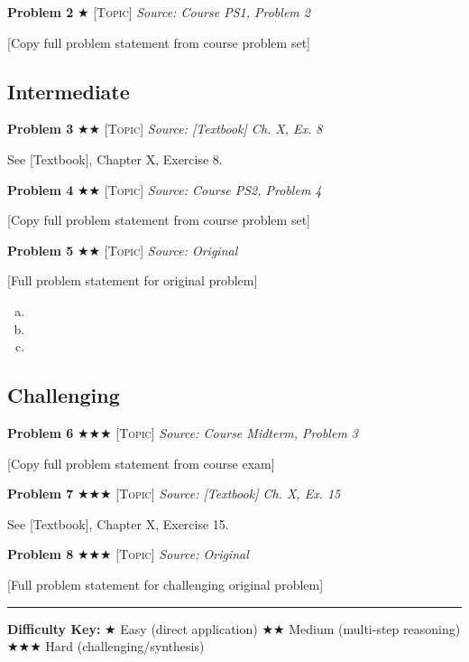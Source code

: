 \documentclass[11pt,a4paper]{article}
\newcommand{\easy}{{\color{green!70!black}$\bigstar$}}
\newcommand{\medium}{{\color{orange!80!black}$\bigstar\bigstar$}}
\newcommand{\hard}{{\color{red!70!black}$\bigstar\bigstar\bigstar$}}
\begin{document}
\bigskip

\textbf{Problem 2} \easy{} \textsc{[Topic]} \hfill \textit{Source: Course PS1, Problem 2}

[Copy full problem statement from course problem set]

\bigskip


\subsection*{Intermediate}

\textbf{Problem 3} \medium{} \textsc{[Topic]} \hfill \textit{Source: [Textbook] Ch. X, Ex. 8}

See [Textbook], Chapter X, Exercise 8.

\bigskip

\textbf{Problem 4} \medium{} \textsc{[Topic]} \hfill \textit{Source: Course PS2, Problem 4}

[Copy full problem statement from course problem set]

\bigskip

\textbf{Problem 5} \medium{} \textsc{[Topic]} \hfill \textit{Source: Original}

[Full problem statement for original problem]

\begin{enumerate}[(a)]
  \item [Part a]
  \item [Part b]
  \item [Part c]
\end{enumerate}

\bigskip


\subsection*{Challenging}

\textbf{Problem 6} \hard{} \textsc{[Topic]} \hfill \textit{Source: Course Midterm, Problem 3}

[Copy full problem statement from course exam]

\bigskip

\textbf{Problem 7} \hard{} \textsc{[Topic]} \hfill \textit{Source: [Textbook] Ch. X, Ex. 15}

See [Textbook], Chapter X, Exercise 15.

\bigskip

\textbf{Problem 8} \hard{} \textsc{[Topic]} \hfill \textit{Source: Original}

[Full problem statement for challenging original problem]

\bigskip

\vfill
\hrule
\smallskip
\textbf{Difficulty Key:} 
\easy{} Easy (direct application) \quad
\medium{} Medium (multi-step reasoning) \quad
\hard{} Hard (challenging/synthesis)
\end{document}

